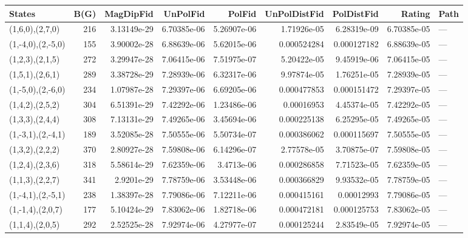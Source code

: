 \begin{tabular}{lrrrrrrrl}
\hline
 States             &   B(G) &   MagDipFid &    UnPolFid &      PolFid &   UnPolDistFid &   PolDistFid &      Rating & Path   \\
\hline
 (1,6,0),(2,7,0)    &    216 & 3.13149e-29 & 6.70385e-06 & 5.26907e-06 &    1.71926e-05 &  6.28319e-09 & 6.70385e-05 & ---    \\
 (1,-4,0),(2,-5,0)  &    155 & 3.90002e-28 & 6.88639e-06 & 5.62015e-06 &    0.000524284 &  0.000127182 & 6.88639e-05 & ---    \\
 (1,2,3),(2,1,5)    &    272 & 3.29947e-28 & 7.06415e-06 & 7.51975e-07 &    5.20422e-05 &  9.45919e-06 & 7.06415e-05 & ---    \\
 (1,5,1),(2,6,1)    &    289 & 3.38728e-29 & 7.28939e-06 & 6.32317e-06 &    9.97874e-05 &  1.76251e-05 & 7.28939e-05 & ---    \\
 (1,-5,0),(2,-6,0)  &    234 & 1.07987e-28 & 7.29397e-06 & 6.69205e-06 &    0.000477853 &  0.000151472 & 7.29397e-05 & ---    \\
 (1,4,2),(2,5,2)    &    304 & 6.51391e-29 & 7.42292e-06 & 1.23486e-06 &    0.00016953  &  4.45374e-05 & 7.42292e-05 & ---    \\
 (1,3,3),(2,4,4)    &    308 & 7.13131e-29 & 7.49265e-06 & 3.45694e-06 &    0.000225138 &  6.25295e-05 & 7.49265e-05 & ---    \\
 (1,-3,1),(2,-4,1)  &    189 & 3.52085e-28 & 7.50555e-06 & 5.50734e-07 &    0.000386062 &  0.000115697 & 7.50555e-05 & ---    \\
 (1,3,2),(2,2,2)    &    370 & 2.80927e-28 & 7.59808e-06 & 6.14296e-07 &    2.77578e-05 &  3.70875e-07 & 7.59808e-05 & ---    \\
 (1,2,4),(2,3,6)    &    318 & 5.58614e-29 & 7.62359e-06 & 3.4713e-06  &    0.000286858 &  7.71523e-05 & 7.62359e-05 & ---    \\
 (1,1,3),(2,2,7)    &    341 & 2.9201e-29  & 7.78759e-06 & 3.53448e-06 &    0.000366829 &  9.93532e-05 & 7.78759e-05 & ---    \\
 (1,-4,1),(2,-5,1)  &    238 & 1.38397e-28 & 7.79086e-06 & 7.12211e-06 &    0.000415161 &  0.00012993  & 7.79086e-05 & ---    \\
 (1,-1,4),(2,0,7)   &    177 & 5.10424e-29 & 7.83062e-06 & 1.82718e-06 &    0.000472181 &  0.000125753 & 7.83062e-05 & ---    \\
 (1,1,4),(2,0,5)    &    292 & 2.52525e-28 & 7.92974e-06 & 4.27977e-07 &    0.000125244 &  2.83549e-05 & 7.92974e-05 & ---    \\

\end{tabular}
